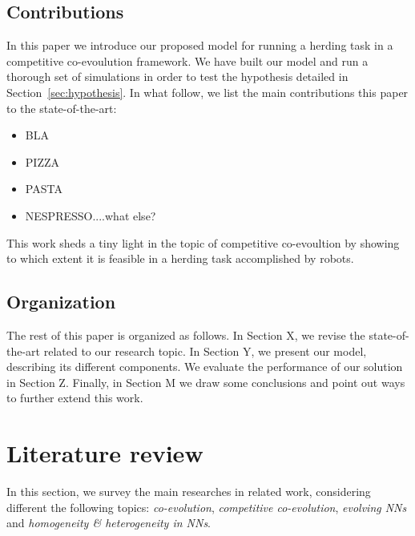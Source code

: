 \documentclass[conference]{IEEEtran}
\begin{document}
\subsection{Contributions}
In this paper we introduce our proposed model for running a herding task in a competitive co-evoulution framework. 
We have built our model and run a thorough set of simulations in order to test the hypothesis detailed in Section~\ref{sec:hypothesis}. 
In what follow, we list the main contributions this paper to the state-of-the-art:
\begin{itemize}
	\item BLA
	\item PIZZA
	\item PASTA
	\item NESPRESSO....what else?
\end{itemize}

This work sheds a tiny light in the topic of competitive co-evoultion by showing to which extent it is feasible in a herding task accomplished by robots.

\subsection{Organization}
The rest of this paper is organized as follows. 
In Section X, we revise the state-of-the-art related to our research topic. 
In Section Y, we present our model, describing its different components. 
We evaluate the performance of our solution in Section Z. 
Finally, in Section M we draw some conclusions and point out ways to further extend this work.

\section{Literature review}
In this section, we survey the main researches in related work, considering different the following topics: \textit{co-evolution}, \textit{competitive co-evolution}, \textit{evolving NNs} and \textit{homogeneity \& heterogeneity in NNs}.
 
\end{document}
